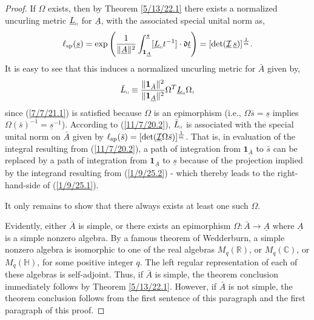\documentclass{amsart}
\numberwithin{equation}{section}
\theoremstyle{definition}
\numberwithin{theorem}{section}
\begin{document}
  \begin{proof}  
  If $\Omega$ exists, then by Theorem \ref{5/13/22.1} there exists a normalized uncurling metric $\underline{L}_{\shortparallel}$ for $\underline{A}$, with the associated special unital norm as, \begin{equation}\label{1/9/25.1} \ell_{\rm sp}(\underline{s}) =    \exp\left(\frac{1}{\|\underline{A}\|^2}\int_{\mathbf{1}_{\underline{A}}}^{\underline{s}} [\underline{L}_{\shortparallel}t^{-1}]\cdot \mathfrak{d}\underline{t}\right) = [\text{det}(\underline{\mathcal{I}}\, \underline{s})]^\frac{1}{m}.\end{equation}  It is easy to see that this induces a normalized uncurling metric for $\bar{A}$ given by, 
  \begin{equation}\label{1/9/25.2} \bar{L}_{\shortparallel} \equiv \frac{\|\mathbf{1}_{\bar{A}}\|^2}{\|\mathbf{1}_{\underline{A}}\|^2} \Omega^T \underline{L}_{\shortparallel} \Omega, \end{equation} since (\ref{7/7/21.1}) is satisfied because $\Omega$ is an epimorphism (i.e., $\Omega\bar{s} =  \underline{s}$ implies $\Omega(\bar{s})^{-1} =  \underline{s}^{-1}$).  According to (\ref{11/7/20.2}), $\bar{L}_{\shortparallel}$ is associated with the special unital norm on $\bar{A}$ given by $\ell_{\rm sp}(\bar{s}) = [\text{det}(\underline{\mathcal{I}}\Omega\bar{s})]^{\frac{1}{m}}$.  That is, in evaluation of the integral resulting from  (\ref{11/7/20.2}), a path of integration from $\mathbf{1}_{\bar{A}}$ to $\bar{s}$ can be replaced by a path of integration from $\mathbf{1}_{\underline{A}}$ to $\underline{s}$ because of the projection implied by the integrand resulting from (\ref{1/9/25.2}) - which thereby leads to the right-hand-side of (\ref{1/9/25.1}). 
  

  It only remains to show that there always exists at least one such $\Omega$. 
  
  Evidently, either $\bar{A}$ is simple, or there exists an epimorphism $\Omega:\bar{A}\rightarrow \underline{A}$ where $ \underline{A}$ is a simple nonzero algebra.   By a famous theorem of Wedderburn, a simple nonzero algebra is isomorphic to one of the real algebras $M_q(\mathbb{R})$, or $M_q(\mathbb{C})$, or $M_q(\mathbb{H})$, for some positive integer $q$.  The left regular representation of each of these algebras is self-adjoint.  Thus, if $\bar{A}$ is simple, the theorem conclusion immediately follows by Theorem \ref{5/13/22.1}.  However, if $\bar{A}$ is not simple, the theorem conclusion follows from the first sentence of this paragraph and the first paragraph of this proof.
  \end{proof}
\end{document}
